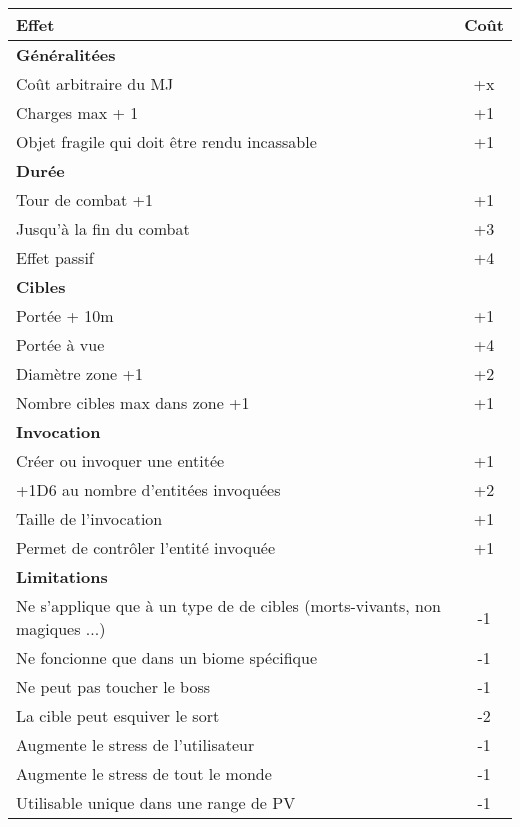 \documentclass[11pt]{article} %
\begin{document}
\noindent
\begin{tabularx}{\linewidth}{|Xc|}
\hline

    \textbf{Effet} & \textbf{Coût}\\
    \hline
    \textbf{Généralitées} &\\
    Coût arbitraire du MJ & +x\\
    Charges max + 1 & +1\\
    Objet fragile qui doit être rendu incassable & +1\\
    \hline
    \textbf{Durée} &\\
    Tour de combat +1 & +1\\
    Jusqu'à la fin du combat & +3\\
    Effet passif & +4\\
    \hline
    \textbf{Cibles} &\\
    Portée + 10m & +1\\
    Portée à vue & +4\\
    Diamètre zone +1 & +2\\
    Nombre cibles max dans zone +1 & +1\\
    \hline
    \textbf{Invocation} &\\
    Créer ou invoquer une entitée & +1\\
    +1D6 au nombre d'entitées invoquées & +2\\
    Taille de l'invocation & +1\\
    Permet de contrôler l'entité invoquée & +1\\
    \hline
    \textbf{Limitations} &\\
    Ne s'applique que à un type de de cibles (morts-vivants, non magiques ...) & -1\\
    Ne foncionne que dans un biome spécifique & -1\\
    Ne peut pas toucher le boss & -1\\
    La cible peut esquiver le sort & -2\\
    Augmente le stress de l'utilisateur & -1\\
    Augmente le stress de tout le monde & -1\\
    Utilisable unique dans une range de PV & -1\\


\hline
\end{tabularx}
\end{document}
